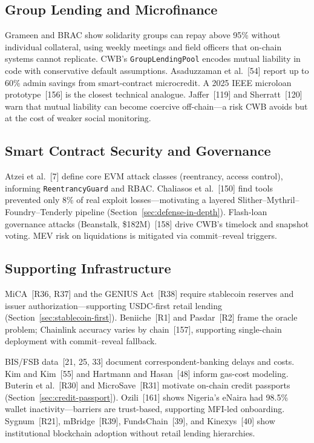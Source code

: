 \documentclass[12pt,a4paper]{report}
\begin{document}
\subsection{Group Lending and Microfinance}

Grameen and BRAC show solidarity groups can repay above 95\% without individual collateral, using weekly meetings and field officers that on-chain systems cannot replicate. CWB's \texttt{GroupLendingPool} encodes mutual liability in code with conservative default assumptions. Asaduzzaman et al.~[54] report up to 60\% admin savings from smart-contract microcredit. A 2025 IEEE microloan prototype~[156] is the closest technical analogue. Jaffer~[119] and Sherratt~[120] warn that mutual liability can become coercive off-chain---a risk CWB avoids but at the cost of weaker social monitoring.

\subsection{Smart Contract Security and Governance}

Atzei et al.~[7] define core EVM attack classes (reentrancy, access control), informing \texttt{ReentrancyGuard} and RBAC. Chaliasos et al.~[150] find tools prevented only 8\% of real exploit losses---motivating a layered Slither--Mythril--Foundry--Tenderly pipeline (Section~\ref{sec:defense-in-depth}). Flash-loan governance attacks (Beanstalk, \$182M)~[158] drive CWB's timelock and snapshot voting. MEV risk on liquidations is mitigated via commit--reveal triggers.

\subsection{Supporting Infrastructure}
\label{sec:lit-stablecoin-reg}
\label{sec:lit-sbt}
\label{sec:lit-institutional}

MiCA~[R36, R37] and the GENIUS Act~[R38] require stablecoin reserves and issuer authorization---supporting USDC-first retail lending (Section~\ref{sec:stablecoin-first}). Beniiche~[R1] and Pasdar~[R2] frame the oracle problem; Chainlink accuracy varies by chain~[157], supporting single-chain deployment with commit--reveal fallback.

BIS/FSB data~[21, 25, 33] document correspondent-banking delays and costs. Kim and Kim~[55] and Hartmann and Hasan~[48] inform gas-cost modeling. Buterin et al.~[R30] and MicroSave~[R31] motivate on-chain credit passports (Section~\ref{sec:credit-passport}). Ozili~[161] shows Nigeria's eNaira had 98.5\% wallet inactivity---barriers are trust-based, supporting MFI-led onboarding. Sygnum~[R21], mBridge~[R39], FundsChain~[39], and Kinexys~[40] show institutional blockchain adoption without retail lending hierarchies.
\end{document}

